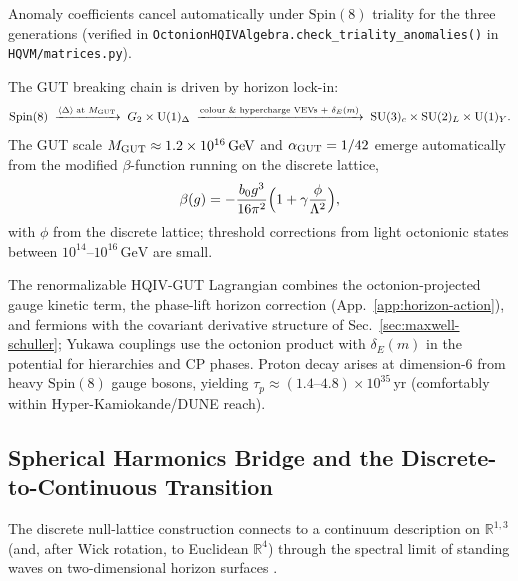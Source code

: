 \documentclass[12pt,a4paper]{article}
\begin{document}
Anomaly coefficients cancel automatically under \(\mathrm{Spin}(8)\) triality for the three generations (verified in \texttt{OctonionHQIVAlgebra.check\_triality\_anomalies()} in \texttt{HQVM/matrices.py}).

The GUT breaking chain is driven by horizon lock-in:
\[
\mathrm{Spin}(8) \;\xrightarrow{\langle \Delta \rangle\;\text{at }M_{\rm GUT}}\; G_2 \times \mathrm{U}(1)_\Delta \;\xrightarrow{\text{colour \& hypercharge VEVs + }\delta_E(m)}\; \mathrm{SU}(3)_c \times \mathrm{SU}(2)_L \times \mathrm{U}(1)_Y.
\]
The GUT scale \(M_{\rm GUT} \approx 1.2 \times 10^{16}\,\mathrm{GeV}\) and \(\alpha_{\rm GUT} = 1/42\) emerge automatically from the modified \(\beta\)-function running on the discrete lattice,
\[
\beta(g) = -\frac{b_0 g^3}{16\pi^2}\Bigl(1 + \gamma \frac{\phi}{\Lambda^2}\Bigr),
\]
with \(\phi\) from the discrete lattice; threshold corrections from light octonionic states between \(10^{14}\)--\(10^{16}\,\mathrm{GeV}\) are small.

The renormalizable HQIV-GUT Lagrangian combines the octonion-projected gauge kinetic term, the phase-lift horizon correction (App.~\ref{app:horizon-action}), and fermions with the covariant derivative structure of Sec.~\ref{sec:maxwell-schuller}; Yukawa couplings use the octonion product with \(\delta_E(m)\) in the potential for hierarchies and CP phases. Proton decay arises at dimension-6 from heavy \(\mathrm{Spin}(8)\) gauge bosons, yielding \(\tau_p \approx (1.4\text{--}4.8)\times 10^{35}\,\mathrm{yr}\) (comfortably within Hyper-Kamiokande/DUNE reach).

\subsection{Spherical Harmonics Bridge and the Discrete-to-Continuous Transition}
\label{sec:spherical-harmonics-bridge}

The discrete null-lattice construction connects to a continuum description on \(\mathbb{R}^{1,3}\) (and, after Wick rotation, to Euclidean \(\mathbb{R}^4\)) through the spectral limit of standing waves on two-dimensional horizon surfaces \citep{hqiv-lean}.
\end{document}
